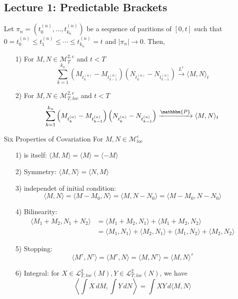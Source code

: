 \documentclass[12pt,a4paper]{article}
\begin{document}
\subsection{Lecture 1: Predictable Brackets}
\begin{proposition}{}{}
    Let $\pi_n=(t_0^{(n)},\ldots, t_{k_n}^{(n)})$ be a sequence of paritions of $[0,t]$ such that $0=t_0^{(n)}\le t_1^{(n)}\le\cdots\le t_{k_n}^{(n)}=t$ and $|\pi_n|\to 0$. Then,
    \begin{enumerate}
        \item[1)] For $M,N\in\mathcal{M}^{2,c}_T$ and $t<T$
        $$
        \sum_{k=1}^{k_n} \left(M_{t_{k}^{(n)}}-M_{t_{k-1}^{(n)}}\right)\left(N_{t_{k}^{(n)}}-N_{t_{k-1}^{(n)}}\right)\xrightarrow{L^1} \langle M, N\rangle_t
        $$
        \item[2)] For $M,N\in\mathcal{M}^{2,c}_{T,loc}$ and $t<T$
        $$
        \sum_{k=1}^{k_n} \left(M_{t_{k}^{(n)}}-M_{t_{k-1}^{(n)}}\right)\left(N_{t_{k}^{(n)}}-N_{t_{k-1}^{(n)}}\right)\xrightarrow{\mathbbm{P}} \langle M, N\rangle_t
        $$
    \end{enumerate}
\end{proposition}
\begin{proposition}{Six Properties of Covariation}{}
    For $M,N\in \mathcal{M}^c_{loc}$
    \begin{enumerate}
        \item[1)]is itself: $\langle M,M\rangle = \langle M\rangle = \langle -M\rangle$
        \item[2)]Symmetry: $\langle M, N\rangle = \langle N, M\rangle$
        \item[3)]independet of initial condition: 
        $$
        \langle M,N\rangle = \langle M-M_0,N\rangle = \langle M, N-N_0\rangle = \langle M-M_0,N-N_0\rangle
        $$
        \item[4)] Bilinearity:
        \begin{align*}
            \langle M_1+M_2, N_1+N_2\rangle &= \langle M_1 + M_2, N_1 \rangle + \langle M_1 + M_2, N_2 \rangle\\
            &= \langle M_1, N_1\rangle + \langle M_2, N_1\rangle + \langle M_1, N_2\rangle +\langle M_2, N_2\rangle
        \end{align*}
        \item[5)]Stopping:
        $$
        \langle M^\tau, N^\tau\rangle = \langle M^\tau, N\rangle = \langle M, N^\tau\rangle = \langle M, N\rangle^\tau
        $$
        \item[6)]Integral: for $X\in\mathcal{L}^2_{T,loc}(M), Y\in\mathcal{L}^2_{T,loc}(N)$, we have
        $$
        \left\langle\int X\, dM, \int Y\, dN\right\rangle = \int XY\, d\langle M,N\rangle
        $$
    \end{enumerate}
\end{proposition}
\end{document}
